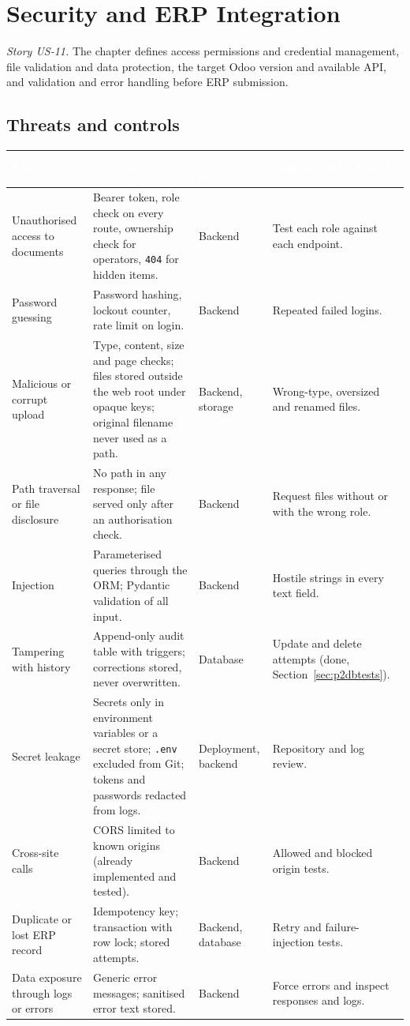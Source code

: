 \documentclass[11pt,a4paper]{report}
\newcommand{\hdr}[1]{\textcolor{white}{\sffamily\bfseries #1}}
\newcommand{\tblstart}{\rowcolors{2}{white}{rowgray}\arrayrulecolor{teal!60}}
\newcommand{\hdrrow}{\rowcolor{navy}}
\begin{document}
\chapter{Security and ERP Integration}\label{ch:p2sec}
\emph{Story US-11.} The chapter defines access permissions and credential management, file validation and data protection, the target Odoo version and available API, and validation and error handling before ERP submission.

\section{Threats and controls}
{\tblstart\footnotesize
\begin{longtable}{L{3.2cm}L{4.8cm}L{2.6cm}L{3.2cm}}
\hdrrow \hdr{Threat} & \hdr{Control} & \hdr{Enforced in} & \hdr{How it will be tested}\\ \endhead
Unauthorised access to documents & Bearer token, role check on every route, ownership check for operators, \texttt{404} for hidden items. & Backend & Test each role against each endpoint.\\
Password guessing & Password hashing, lockout counter, rate limit on login. & Backend & Repeated failed logins.\\
Malicious or corrupt upload & Type, content, size and page checks; files stored outside the web root under opaque keys; original filename never used as a path. & Backend, storage & Wrong-type, oversized and renamed files.\\
Path traversal or file disclosure & No path in any response; file served only after an authorisation check. & Backend & Request files without or with the wrong role.\\
Injection & Parameterised queries through the ORM; Pydantic validation of all input. & Backend & Hostile strings in every text field.\\
Tampering with history & Append-only audit table with triggers; corrections stored, never overwritten. & Database & Update and delete attempts (done, Section~\ref{sec:p2dbtests}).\\
Secret leakage & Secrets only in environment variables or a secret store; \texttt{.env} excluded from Git; tokens and passwords redacted from logs. & Deployment, backend & Repository and log review.\\
Cross-site calls & CORS limited to known origins (already implemented and tested). & Backend & Allowed and blocked origin tests.\\
Duplicate or lost ERP record & Idempotency key; transaction with row lock; stored attempts. & Backend, database & Retry and failure-injection tests.\\
Data exposure through logs or errors & Generic error messages; sanitised error text stored. & Backend & Force errors and inspect responses and logs.\\
\hline
\end{longtable}}
\end{document}
